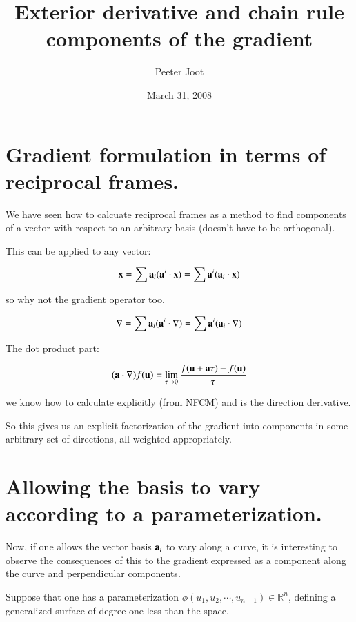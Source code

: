 \documentclass{article}      %
\title{ Exterior derivative and chain rule components of the gradient } %
\author{Peeter Joot}         %
\date{ March 31, 2008}        %
\newcommand{\grad}[0]{\nabla}
\begin{document}

\maketitle{}

\section{ Gradient formulation in terms of reciprocal frames. }

We have seen how to calcuate reciprocal frames as a method to find
components of a vector with respect to an arbitrary basis (doesn't have
to be orthogonal).

This can be applied to any vector:

\[
\mathbf{x} = \sum \mathbf{a}_i (\mathbf{a}^i \cdot \mathbf{x}) = \sum \mathbf{a}^i (\mathbf{a}_i \cdot \mathbf{x})
\]

so why not the gradient operator too.

\begin{equation}
\grad = \sum \Ba_i (\Ba^i \cdot \grad) = \sum \Ba^i (\Ba_i \cdot \grad)
\end{equation}

The dot product part:

\begin{equation}
(\Ba \cdot \grad) f(\Bu) = \lim_{\tau \rightarrow 0}
\frac{ f(\Bu + \Ba \tau) - f(\Bu ) }{ \tau }
\end{equation}

we know how to calculate explicitly (from NFCM) and is the direction
derivative.

So this gives us an explicit factorization of the gradient into components
in some arbitrary set of directions, all weighted appropriately.

\section{ Allowing the basis to vary according to a parameterization. }

Now, if one allows the vector basis ${\mathbf{a}_i}$ to vary along a curve, it
is interesting to observe the consequences of this to the gradient expressed
as a component along the curve and perpendicular components.

Suppose that one has a parameterization $\phi(u_1, u_2, \cdots, u_{n-1}) \in \mathbb{R}^n$, defining a generalized surface of degree one less than the space.
\end{document}

